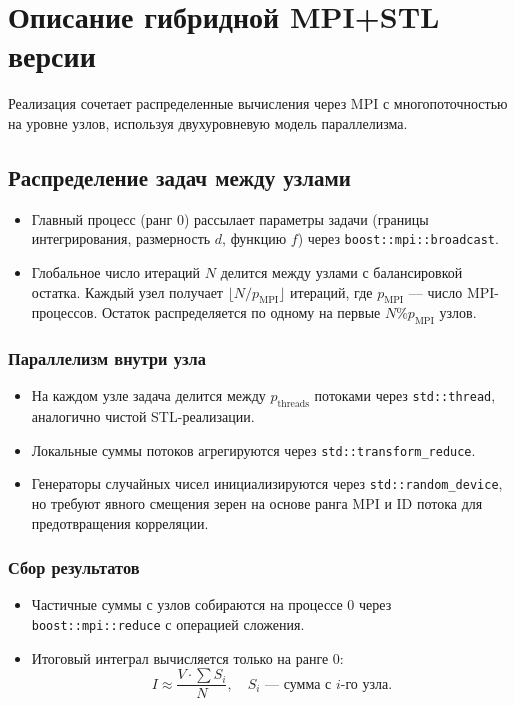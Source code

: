 \documentclass[a4paper,12pt]{article}
\begin{document}
\section{Описание гибридной MPI+STL версии}

Реализация сочетает распределенные вычисления через MPI с многопоточностью на уровне узлов, используя двухуровневую модель параллелизма. 

\subsection{Распределение задач между узлами}
\begin{itemize}
\item Главный процесс (ранг 0) рассылает параметры задачи (границы интегрирования, размерность \( d \), функцию \( f \)) через \texttt{boost::mpi::broadcast}.
\item Глобальное число итераций \( N \) делится между узлами с балансировкой остатка. Каждый узел получает \( \lfloor N/p_{\text{MPI}} \rfloor \) итераций, где \( p_{\text{MPI}} \) — число MPI-процессов. Остаток распределяется по одному на первые \( N \% p_{\text{MPI}} \) узлов.
\end{itemize}

\subsubsection{Параллелизм внутри узла}
\begin{itemize}
\item На каждом узле задача делится между \( p_{\text{threads}} \) потоками через \texttt{std::thread}, аналогично чистой STL-реализации.
\item Локальные суммы потоков агрегируются через \texttt{std::transform\_reduce}.
\item Генераторы случайных чисел инициализируются через \texttt{std::random\_device}, но требуют явного смещения зерен на основе ранга MPI и ID потока для предотвращения корреляции.
\end{itemize}

\subsubsection{Сбор результатов}
\begin{itemize}
\item Частичные суммы с узлов собираются на процессе 0 через \texttt{boost::mpi::reduce} с операцией сложения.
\item Итоговый интеграл вычисляется только на ранге 0: 
\[
I \approx \frac{V \cdot \sum S_i}{N}, \quad S_i \text{ — сумма с } i\text{-го узла}.
\]
\end{itemize}
\end{document}
